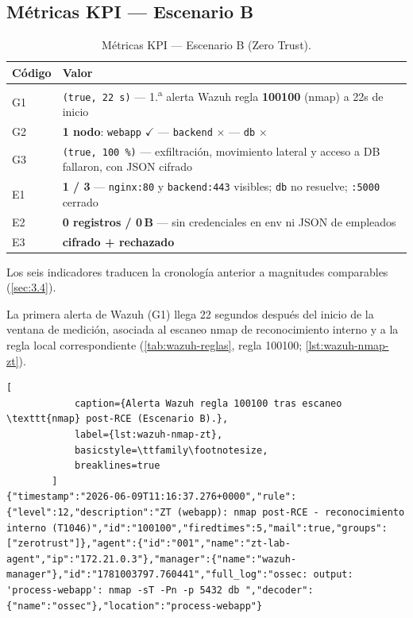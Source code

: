 \documentclass[11pt,spanish,listoffigures,listoftables]{tfgetsinf}
\begin{document}
        \subsection{Métricas KPI — Escenario B}
        \begin{table}[ht]
          \centering
          \label{tab:kpi-b}
          \footnotesize
          \begin{tabular}{p{1cm} p{12cm}}
            \textbf{Código} & \textbf{Valor} \\
            \midrule
            G1 & \texttt{(true, 22\,s)} --- 1.\textsuperscript{a} alerta Wazuh regla \textbf{100100} (nmap) a 22s de inicio \\
            G2 & \textbf{1 nodo}: \texttt{webapp} $\checkmark$ --- \texttt{backend} $\times$ --- \texttt{db} $\times$ \\
            G3 & \texttt{(true, 100\,\%)} --- exfiltración, movimiento lateral y acceso a DB fallaron, con JSON cifrado \\
            E1 & \textbf{1 / 3} --- \texttt{nginx:80} y \texttt{backend:443} visibles; \texttt{db} no resuelve; \texttt{:5000} cerrado \\
            E2 & \textbf{0 registros / 0\,B} --- sin credenciales en env ni JSON de empleados \\
            E3 & \textbf{cifrado + rechazado} \\
            \bottomrule
          \end{tabular}
          \caption{Métricas KPI — Escenario B (Zero Trust).}
        \end{table}

        Los seis indicadores traducen la cronología anterior a magnitudes comparables (\cref{sec:3.4}).
        
        La primera alerta de Wazuh (G1) llega 22 segundos después del inicio de la ventana de medición, asociada al escaneo nmap de reconocimiento interno y a la regla local correspondiente (\cref{tab:wazuh-reglas}, regla 100100; \cref{lst:wazuh-nmap-zt}).

        \begin{lstlisting}[
            caption={Alerta Wazuh regla 100100 tras escaneo \texttt{nmap} post-RCE (Escenario B).},
            label={lst:wazuh-nmap-zt},
            basicstyle=\ttfamily\footnotesize,
            breaklines=true
        ]
{"timestamp":"2026-06-09T11:16:37.276+0000","rule":{"level":12,"description":"ZT (webapp): nmap post-RCE - reconocimiento interno (T1046)","id":"100100","firedtimes":5,"mail":true,"groups":["zerotrust"]},"agent":{"id":"001","name":"zt-lab-agent","ip":"172.21.0.3"},"manager":{"name":"wazuh-manager"},"id":"1781003797.760441","full_log":"ossec: output: 'process-webapp': nmap -sT -Pn -p 5432 db ","decoder":{"name":"ossec"},"location":"process-webapp"}
        \end{lstlisting}
        
\end{document}
